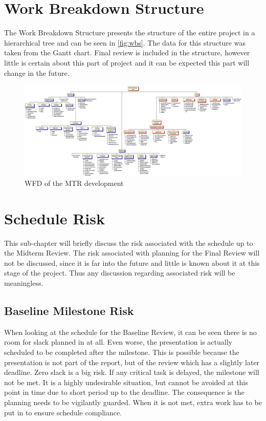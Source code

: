 \documentclass[a4paper]{report}
\begin{document}
\section{Work Breakdown Structure}
The Work Breakdown Structure presents the structure of the entire project in a hierarchical tree and can be seen in \autoref{fig:wbs}. The data for this structure was taken from the Gantt chart. Final review is included in the structure, however little is certain about this part of project and it can be expected this part will change in the future.  

\begin{figure}[h]
	\centering
	
	\includegraphics[width=\textheight, angle=270]{Figures/WBS.png}
	\caption{WFD of the MTR development}
	\label{fig:wbs}
	
\end{figure}
\section{Schedule Risk}
This sub-chapter will briefly discuss the risk associated with the schedule up to the Midterm Review. The risk associated with planning for the Final Review will not be discussed, since it is far into the future and little is known about it at this stage of the project. Thus any discussion regarding associated risk will be meaningless. 
\subsection{Baseline Milestone Risk}
When looking at the schedule for the Baseline Review, it can be seen there is no room for slack planned in at all. Even worse, the presentation is actually scheduled to be completed after the milestone. This is possible because the presentation is not part of the report, but of the review which has a slightly later deadline. 
\newline
Zero slack is a big risk. If any critical task is delayed, the milestone will not be met. It is a highly undesirable situation, but cannot be avoided at this point in time due to short period up to the deadline. The consequence is the planning needs to be vigilantly guarded. When it is not met, extra work has to be put in to ensure schedule compliance.
\end{document}

